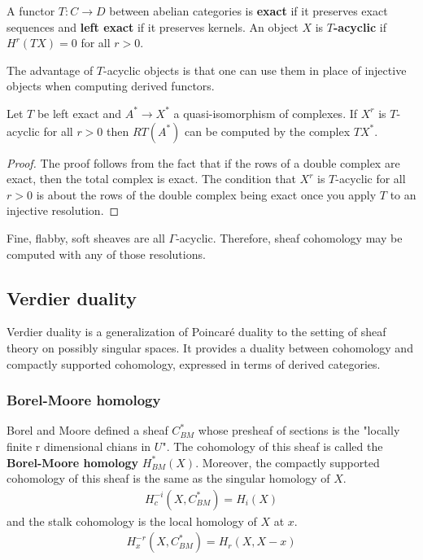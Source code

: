 \documentclass[12pt]{article}
\begin{document}
    \begin{definition}
        A functor $T:C\to D$ between abelian categories is \textbf{exact}
        if it preserves exact sequences and \textbf{left exact} if it
        preserves kernels. An object $X$ is \textbf{$T$-acyclic} if $H^r(TX) = 0$
        for all $r>0$.
    \end{definition}
    The advantage of $T$-acyclic objects is that one can use them in place of injective objects
    when computing derived functors.

    \begin{lemma}
        Let $T$ be left exact and $A^* \to X^*$ a quasi-isomorphism of complexes.
        If $X^r$ is $T$-acyclic for all $r>0$ then $RT(A^*)$ can be computed by
        the complex $TX^*$.
    \end{lemma}

    \begin{proof}
        The proof follows from the fact that if the rows of a double complex are exact, then
        the total complex is exact. The condition that $X^r$ is $T$-acyclic for all $r>0$ is about
        the rows of the double complex being exact once you apply $T$ to an injective resolution.
    \end{proof}
    \begin{remark}
        Fine, flabby, soft sheaves are all $\Gamma$-acyclic. Therefore,
        sheaf cohomology may be computed with any of those resolutions.
    \end{remark}



\subsection{Verdier duality}
Verdier duality is a generalization of Poincaré duality to the setting of sheaf theory on possibly singular spaces. It provides a duality between cohomology and compactly supported cohomology, expressed in terms of derived categories.

\subsubsection{Borel-Moore homology}
Borel and Moore defined a sheaf $C^*_{BM}$ whose presheaf of sections is the
"locally finite r dimensional chians in $U$". The cohomology of this sheaf is called the
\textbf{Borel-Moore homology} $H^*_{BM}(X)$. Moreover,
the compactly supported cohomology of this sheaf is the same as the singular homology of $X$.
\begin{align*}
    H^{-i}_c(X,C^*_{BM}) = H_i(X)
\end{align*} and the stalk cohomology is the local homology of $X$ at $x$. \begin{align*}
    H^{-r}_x(X,C^*_{BM}) = H_r(X,X-x)
\end{align*}
\end{document}
